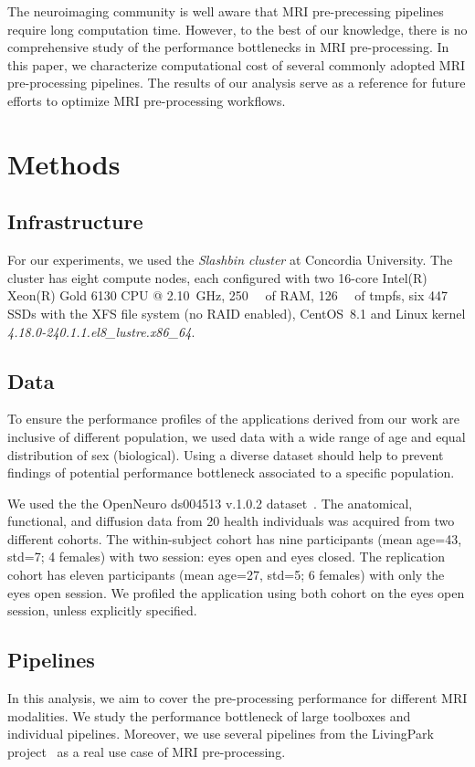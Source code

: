 \documentclass[conference]{IEEEtran}
\begin{document}
The neuroimaging community is well aware that MRI pre-precessing pipelines require long computation time. However, to the best of our knowledge, there is no comprehensive study of the performance bottlenecks in MRI pre-processing. In this paper, we characterize computational cost of several commonly adopted MRI pre-processing pipelines. The results of our analysis serve as a reference for future efforts to optimize MRI pre-processing workflows.

\section{Methods}
\subsection{Infrastructure}
For our experiments, we used the \textit{Slashbin cluster} at Concordia University. The cluster has eight compute nodes, each configured with two 16-core Intel(R) Xeon(R) Gold 6130 CPU @ \SI{2.10}{\giga\hertz}, \SI{250}{\gibi\byte} of RAM, \SI{126}{\gibi\byte} of tmpfs, six \SI{447}{\gibi\byte} SSDs with the XFS file system (no RAID enabled), CentOS~8.1 and Linux kernel \textit{4.18.0-240.1.1.el8\_lustre.x86\_64}.

\subsection{Data}
To ensure the performance profiles of the applications derived from our work are inclusive of different population, we used data with a wide range of age and equal distribution of sex (biological). Using a diverse dataset should help to prevent findings of potential performance bottleneck associated to a specific population.

We used the the OpenNeuro ds004513 v.1.0.2 dataset~\cite{ds004513:1.0.2}. The anatomical, functional, and diffusion data from 20 health individuals was acquired from two different cohorts. The within-subject cohort has nine participants (mean age=43, std=7; 4 females) with two session: eyes open and eyes closed. The replication cohort has eleven participants (mean age=27, std=5; 6 females) with only the eyes open session. We profiled the application using both cohort on the eyes open session, unless explicitly specified.

\subsection{Pipelines}
In this analysis, we aim to cover the pre-processing performance for different MRI modalities. We study the performance bottleneck of large toolboxes and individual pipelines. Moreover, we use several pipelines from the LivingPark project~\cite{livingpark} as a real use case of MRI pre-processing.
\end{document}
